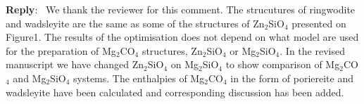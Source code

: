 \documentclass[a4paper]{article}
\newcounter{reviewer}
\newenvironment{reply}
   {\medskip \noindent \begin{sf}\textbf{Reply}:\  }
   {\medskip \end{sf}}
\begin{document}
\begin{reply}
We thank the reviewer for this comment. 
The strucutures of ringwodite and wadsleyite are the same as some of the structures of Zn$_2$SiO$_4$ presented on Figure1. 
The results of the optimisation does not depend on what model are used for the preparation of Mg$_2$CO$_4$ structures, Zn$_2$SiO$_4$ or Mg$_2$SiO$_4$. 
In the revised manuscript we have changed Zn$_2$SiO$_4$ on Mg$_2$SiO$_4$ to show comparison of Mg$_2$CO$_4$ and Mg$_2$SiO$_4$ systems.
The enthalpies of Mg$_2$CO$_4$ in the form of poriereite and wadsleyite have been calculated and corresponding discussion has been added.


\end{reply}
\end{document}
